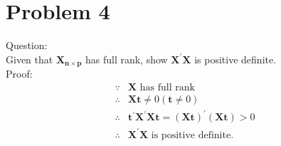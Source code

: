\documentclass{article}
\begin{document}
  
\section{Problem 4}
Question:\\
Given that $\bm{X_{n\times p}}$ has full rank, show $\bm{X^{\prime}X}$
is positive definite.\\
Proof:\\
\begin{align*}
  \because &\bm{X}\text{ has full rank}\\
  \therefore &\bm{Xt}\neq 0 (\bm{t}\neq 0)\\
  \therefore &\bm{t^{\prime}X^{\prime}Xt}=(\bm{Xt})^{\prime}(\bm{Xt})>0\\
  \therefore &\bm{X^{\prime}X}\text{ is positive definite}
  .
  \end{align*}
\end{document}
